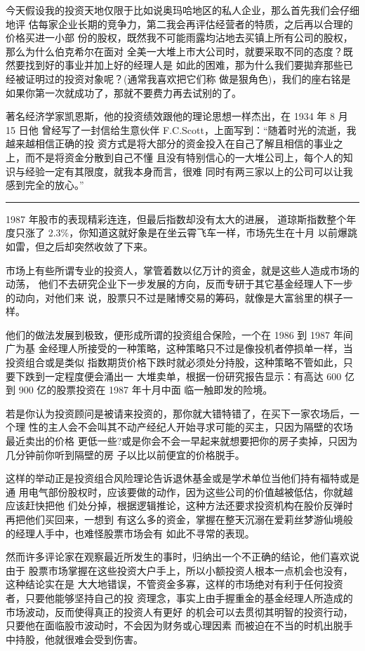\documentclass[UTF8,a4paper,zihao=-4,fontset = windows]{ctexart} %
\begin{document}
今天假设我的投资天地仅限于比如说奥玛哈地区的私人企业，那么首先我们会仔细地评
估每家企业长期的竞争力，第二我会再评估经营者的特质，之后再以合理的价格买进一小部
份的股权，既然我不可能雨露均沾地去买镇上所有公司的股权，那么为什么伯克希尔在面对
全美一大堆上市大公司时，就要采取不同的态度？既然要找到好的事业并加上好的经理人是
如此的困难，那为什么我们要拋弃那些已经被证明过的投资对象呢？(通常我喜欢把它们称
做是狠角色)，我们的座右铭是如果你第一次就成功了，那就不要费力再去试别的了。

著名经济学家凯恩斯，他的投资绩效跟他的理论思想一样杰出，在 1934 年 8 月 15 日他
曾经写了一封信给生意伙伴 F.C.Scott，上面写到：“随着时光的流逝，我越来越相信正确的投
资方式是将大部分的资金投入在自己了解且相信的事业之上，而不是将资金分散到自己不懂
且没有特别信心的一大堆公司上，每个人的知识与经验一定有其限度，就我本身而言，很难
同时有两三家以上的公司可以让我感到完全的放心。”

\rule{10cm}{0.4pt}

1987 年股市的表现精彩连连，但最后指数却没有太大的进展，
道琼斯指数整个年度只涨了 2.3\%，你知道这就好象是在坐云霄飞车一样，市场先生在十月
以前爆跳如雷，但之后却突然收敛了下来。

市场上有些所谓专业的投资人，掌管着数以亿万计的资金，就是这些人造成市场的动荡，
他们不去研究企业下一步发展的方向，反而专研于其它基金经理人下一步的动向，对他们来
说，股票只不过是赌博交易的筹码，就像是大富翁里的棋子一样。

他们的做法发展到极致，便形成所谓的投资组合保险，一个在 1986 到 1987 年间广为基
金经理人所接受的一种策略，这种策略只不过是像投机者停损单一样，当投资组合或是类似
指数期货价格下跌时就必须处分持股，这种策略不管如此，只要下跌到一定程度便会涌出一
大堆卖单，根据一份研究报告显示：有高达 600 亿到 900 亿的股票投资在 1987 年十月中面
临一触即发的险境。

若是你认为投资顾问是被请来投资的，那你就大错特错了，在买下一家农场后，一个理
性的主人会不会叫其不动产经纪人开始寻求可能的买主，只因为隔壁的农场最近卖出的价格
更低一些?或是你会不会一早起来就想要把你的房子卖掉，只因为几分钟前你听到隔壁的房
子以比以前便宜的价格脱手。

这样的举动正是投资组合风险理论告诉退休基金或是学术单位当他们持有福特或是通
用电气部份股权时，应该要做的动作，因为这些公司的价值越被低估，你就越应该赶快把他
们处分掉，根据逻辑推论，这种方法还要求投资机构在股价反弹时再把他们买回来，一想到
有这么多的资金，掌握在整天沉溺在爱莉丝梦游仙境般的经理人手中，也难怪股票市场会有
如此不寻常的表现。

然而许多评论家在观察最近所发生的事时，归纳出一个不正确的结论，他们喜欢说由于
股票市场掌握在这些投资大户手上，所以小额投资人根本一点机会也没有，这种结论实在是
大大地错误，不管资金多寡，这样的市场绝对有利于任何投资者，只要他能够坚持自己的投
资理念，事实上由手握重金的基金经理人所造成的市场波动，反而使得真正的投资人有更好
的机会可以去贯彻其明智的投资行动，只要他在面临股市波动时，不会因为财务或心理因素
而被迫在不当的时机出脱手中持股，他就很难会受到伤害。
\end{document}

